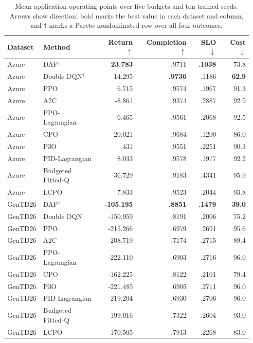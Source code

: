 \documentclass[acmsmall,screen,review,anonymous]{acmart}
\newcommand{\method}{\textsc{DAP}\xspace}
\begin{document}
\begin{table}[t]
\caption{Mean application operating points over five budgets and ten trained
seeds.  Arrows show direction; bold marks the best value in each dataset and
column, and \(\dagger\) marks a Pareto-nondominated row over all four outcomes.}
\label{tab:main}
\small
\begin{tabular}{llrrrr}
\toprule
Dataset & Method & Return $\uparrow$ & Completion $\uparrow$ & SLO $\downarrow$ & Cost $\downarrow$\\
\midrule
Azure & \method\(^{\dagger}\) & \textbf{23.783} & .9711 & \textbf{.1038} & 73.8\\
Azure & Double DQN\(^{\dagger}\) & 14.295 & \textbf{.9736} & .1186 & \textbf{62.9}\\
Azure & PPO & 6.715 & .9574 & .1967 & 91.3\\
Azure & A2C & -8.861 & .9374 & .2887 & 92.9\\
Azure & PPO-Lagrangian & 6.465 & .9561 & .2068 & 92.5\\
Azure & CPO & 20.021 & .9684 & .1200 & 86.0\\
Azure & P3O & .431 & .9551 & .2251 & 90.3\\
Azure & PID-Lagrangian & 8.033 & .9578 & .1977 & 92.2\\
Azure & Budgeted Fitted-Q & -36.729 & .9183 & .4341 & 95.9\\
Azure & LCPO & 7.833 & .9523 & .2044 & 93.8\\
\midrule
GenTD26 & \method\(^{\dagger}\) & \textbf{-105.195} & \textbf{.8851} & \textbf{.1479} & \textbf{39.0}\\
GenTD26 & Double DQN & -150.959 & .8191 & .2006 & 75.2\\
GenTD26 & PPO & -215.266 & .6979 & .2691 & 95.6\\
GenTD26 & A2C & -208.719 & .7174 & .2715 & 89.4\\
GenTD26 & PPO-Lagrangian & -222.110 & .6903 & .2716 & 96.0\\
GenTD26 & CPO & -162.225 & .8122 & .2101 & 79.4\\
GenTD26 & P3O & -221.485 & .6905 & .2711 & 96.0\\
GenTD26 & PID-Lagrangian & -219.204 & .6930 & .2706 & 96.0\\
GenTD26 & Budgeted Fitted-Q & -199.016 & .7322 & .2604 & 93.0\\
GenTD26 & LCPO & -170.505 & .7913 & .2268 & 83.0\\
\bottomrule
\end{tabular}
\end{table}
\end{document}
